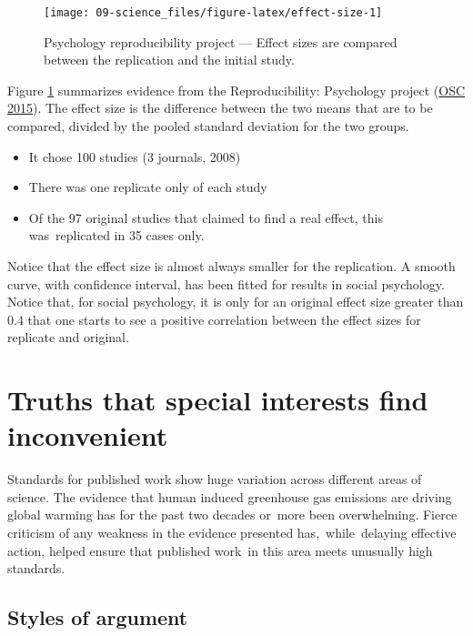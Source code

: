 \documentclass[
  10pt,
  b5paper]{book}
\providecommand{\tightlist}{%
  \setlength{\itemsep}{0pt}\setlength{\parskip}{0pt}}
\begin{document}
\begin{figure}[H]

{\centering \texttt{[image: 09-science\_files/figure-latex/effect-size-1]} 

}

\caption{Psychology reproducibility project --- Effect sizes are
compared between the replication and the initial study.}\label{fig:effect-size}
\end{figure}

Figure \ref{fig:effect-size} summarizes evidence from
the Reproducibility: Psychology project (\protect\hyperlink{ref-r1_osc_EstRep2015}{OSC 2015}).
The effect size is the difference between the two means that
are to be compared, divided by the pooled standard deviation
for the two groups.

\begin{itemize}
\tightlist
\item
  It chose 100 studies (3 journals, 2008)
\item
  There was one replicate only of each study
\item
  Of the 97 original studies that claimed to find a real effect,
  this was~replicated in 35 cases only.
\end{itemize}

Notice that the effect size is almost always smaller for
the replication. A smooth curve, with confidence interval,
has been fitted for results in social psychology. Notice
that, for social psychology, it is only for an original
effect size greater than 0.4 that one starts to see a
positive correlation between the effect sizes for replicate
and original.

\hypertarget{truths-that-special-interests-find-inconvenient}{%
\section{Truths that special interests find inconvenient}\label{truths-that-special-interests-find-inconvenient}}

Standards for published work show huge variation across
different areas of science.
The evidence that human induced greenhouse gas emissions
are driving global warming has for the past two decades
or~more been overwhelming. Fierce criticism of any weakness
in the evidence presented has,~while~delaying effective
action, helped ensure that published work~in this area meets
unusually high standards.

\hypertarget{styles-of-argument}{%
\subsection*{Styles of argument}\label{styles-of-argument}}
\end{document}
